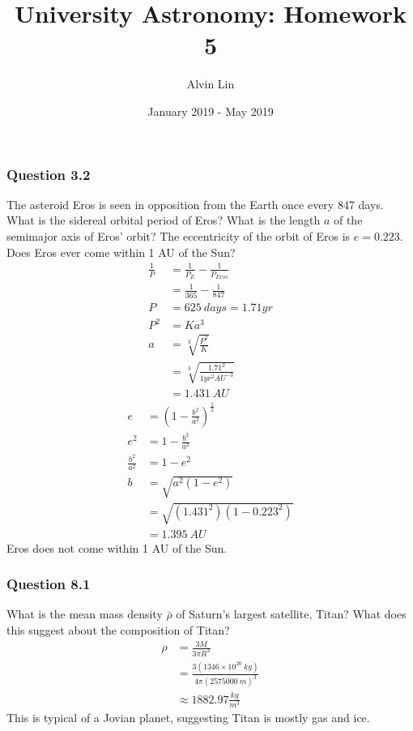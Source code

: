 \documentclass{math}
\title{University Astronomy: Homework 5}
\author{Alvin Lin}
\date{January 2019 - May 2019}
\begin{document}
\maketitle

\subsubsection*{Question 3.2}
The asteroid Eros is seen in opposition from the Earth once every 847 days. What
is the sidereal orbital period of Eros? What is the length \( a \) of the
semimajor axis of Eros' orbit? The eccentricity of the orbit of Eros is
\( e = 0.223 \). Does Eros ever come within 1 AU of the Sun?
\begin{align*}
  \frac{1}{P} &= \frac{1}{P_E}-\frac{1}{P_{Eros}} \\
  &= \frac{1}{365}-\frac{1}{847} \\
  P &= 625~days = 1.71 yr \\
  P^2 &= Ka^3 \\
  a &= \sqrt[3]{\frac{P^2}{K}} \\
  &= \sqrt[3]{\frac{1.71^2}{1yr^2AU^{-3}}} \\
  &= 1.431~AU
\end{align*}
\begin{align*}
  e &= (1-\frac{b^2}{a^2})^{\frac{1}{2}} \\
  e^2 &= 1-\frac{b^2}{a^2} \\
  \frac{b^2}{a^2} &= 1-e^2 \\
  b &= \sqrt{a^2(1-e^2)} \\
  &= \sqrt{(1.431^2)(1-0.223^2)} \\
  &= 1.395~AU
\end{align*}
Eros does not come within 1 AU of the Sun.

\subsubsection*{Question 8.1}
What is the mean mass density \( \bar{\rho} \) of Saturn's largest satellite,
Titan? What does this suggest about the composition of Titan?
\begin{align*}
  \rho &= \frac{3M}{3\pi R^3} \\
  &= \frac{3(1346\times10^{20}~kg)}{4\pi(2575000~m)^3} \\
  &\approx 1882.97\frac{kg}{m^3}
\end{align*}
This is typical of a Jovian planet, suggesting Titan is mostly gas and ice.
\end{document}
